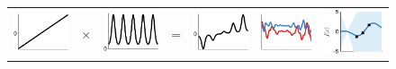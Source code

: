 \begin{figure}
\begin{tabular}{ccccc|c|c}
  \includegraphics[width=\fw]{../figures/structure_examples/lin_kernel} & $\times$ & \includegraphics[width=\fw]{../figures/structure_examples/per_kernel} & = & \includegraphics[width=\fw]{../figures/structure_examples/lin_times_per} & \includegraphics[width=\fw]{../figures/structure_examples/lin_times_per_draws} & \includegraphics[width=\fw]{../figures/structure_examples/se_times_lin_post} \\

\end{tabular}
\end{figure}
